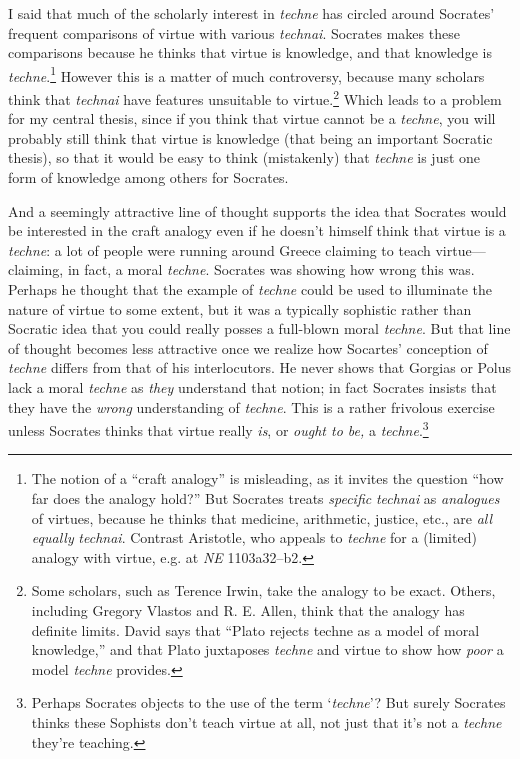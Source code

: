 ﻿\documentclass[11pt]{amsart}
\begin{document}
I said that much of the scholarly interest in \emph{techne} has circled around Socrates' frequent comparisons of virtue with various \emph{technai}. Socrates makes these comparisons because he thinks that virtue is knowledge, and that knowledge is \emph{techne}.\footnote{The notion of a ``craft analogy'' is misleading, as it invites the question ``how far does the analogy hold?'' But Socrates treats \emph{specific} \emph{technai} as \emph{analogues} of virtues, because he thinks that medicine, arithmetic, justice, etc., are \emph{all equally} \emph{technai}. Contrast Aristotle, who appeals to \emph{techne} for a (limited) analogy with virtue, e.g. at \emph{NE} 1103a32--b2.} However this is a matter of much controversy, because many scholars think that \emph{technai} have features unsuitable to virtue.\footnote{Some scholars, such as Terence Irwin, take the analogy to be exact. Others, including Gregory Vlastos and R. E. Allen, think that the analogy has definite limits. David \citet[6]{roochnik1996aaw} says that ``Plato rejects techne as a model of moral knowledge,'' and that Plato juxtaposes \emph{techne} and virtue to show how \emph{poor} a model \emph{techne} provides.} Which leads to a problem for my central thesis, since if you think that virtue cannot be a \emph{techne}, you will probably still think that virtue is knowledge (that being an important Socratic thesis), so that it would be easy to think (mistakenly) that \emph{techne} is just one form of knowledge among others for Socrates.

And a seemingly attractive line of thought supports the idea that Socrates would be interested in the craft analogy even if he doesn't himself think that virtue is a \emph{techne}: a lot of people were running around Greece claiming to teach virtue---claiming, in fact, a moral \emph{techne}. Socrates was showing how wrong this was. Perhaps he thought that the example of \emph{techne} could be used to illuminate the nature of virtue to some extent, but it was a typically sophistic rather than Socratic idea that you could really posses a full-blown moral \emph{techne}. But that line of thought becomes less attractive once we realize how Socartes' conception of \emph{techne} differs from that of his interlocutors. He never shows that Gorgias or Polus lack a moral \emph{techne} as \emph{they} understand that notion; in fact Socrates insists that they have the \emph{wrong} understanding of \emph{techne}. This is a rather frivolous exercise unless Socrates thinks that virtue really \emph{is}, or \emph{ought to be,} a \emph{techne}.\footnote{Perhaps Socrates objects to the use of the term `\emph{techne}'? But surely Socrates thinks these Sophists don't teach virtue at all, not just that it's not a \emph{techne} they're teaching.}
\end{document}

